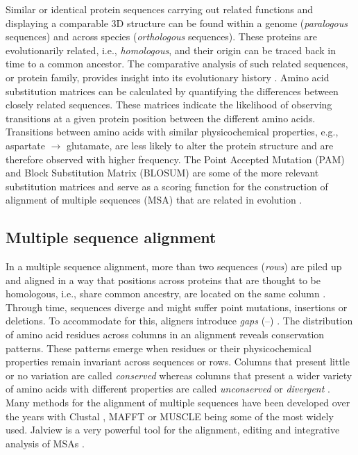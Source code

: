 Similar or identical protein sequences carrying out related functions and displaying a comparable 3D structure can be found within a genome (\textit{paralogous} sequences) and across species (\textit{orthologous} sequences). These proteins are evolutionarily related, i.e., \textit{homologous}, and their origin can be traced back in time to a common ancestor. The comparative analysis of such related sequences, or protein family, provides insight into its evolutionary history \cite{BARTON_1990_MSA}. Amino acid substitution matrices can be calculated by quantifying the differences between closely related sequences. These matrices indicate the likelihood of observing transitions at a given protein position between the different amino acids. Transitions between amino acids with similar physicochemical properties, e.g., aspartate $\rightarrow$ glutamate, are less likely to alter the protein structure and are therefore observed with higher frequency. The Point Accepted Mutation (PAM) \cite{DAYHOFF_1978_PAM} and Block Substitution Matrix (BLOSUM) \cite{HENIKOFF_1992_BLOSUM} are some of the more relevant substitution matrices and serve as a scoring function for the construction of alignment of multiple sequences (MSA) that are related in evolution \cite{BARTON_1987_MSA}.

\subsection{Multiple sequence alignment}

In a multiple sequence alignment, more than two sequences (\textit{rows}) are piled up and aligned in a way that positions across proteins that are thought to be homologous, i.e., share common ancestry, are located on the same column \cite{NEEDLEMAN_1970_MSA}. Through time, sequences diverge and might suffer point mutations, insertions or deletions. To accommodate for this, aligners introduce \textit{gaps} (--) \cite{SMITH_1981_MSA}. The distribution of amino acid residues across columns in an alignment reveals conservation patterns. These patterns emerge when residues or their physicochemical properties remain invariant across sequences or rows. Columns that present little or no variation are called \textit{conserved} whereas columns that present a wider variety of amino acids with different properties are called \textit{unconserved} or \textit{divergent} \cite{LIVINGSTONE_1993_CONS}. Many methods for the alignment of multiple sequences have been developed over the years with Clustal \cite{HIGGINS_1988_CLUSTAL, HIGGINS_1992_CLUSTALV, THOMPSON_1994_CLUSTALW, JEANMOUGIN_1998_CLUSTALX, SIEVERS_2011_CLUSTALO}, MAFFT \cite{KATOH_2002_MAFFT, KATOH_2008_MAFFT, KATOH_2013_MAFFT} or MUSCLE \cite{EDGAR_2004_MUSCLE, EDGAR_2022_MUSCLE5} being some of the most widely used. Jalview is a very powerful tool for the alignment, editing and integrative analysis of MSAs \cite{WATERHOUSE_2009_JALVIEW}.

